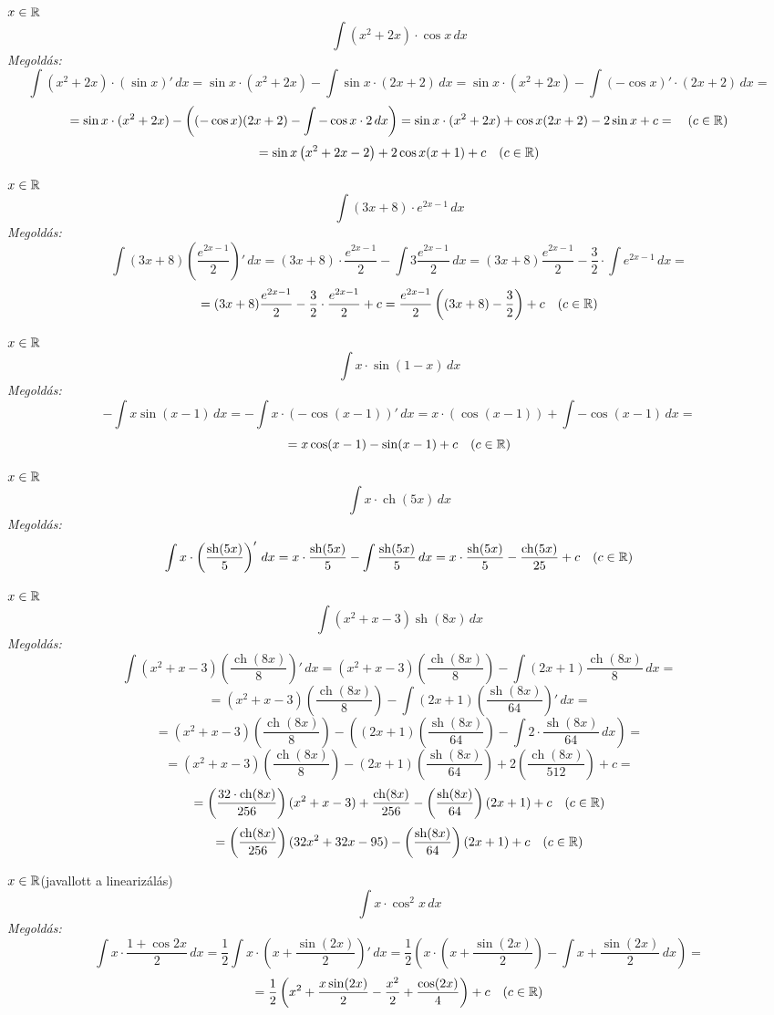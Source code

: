 \documentclass[a4paper,11.5pt]{article}
\DeclareMathOperator{\sh}{sh}
\DeclareMathOperator{\ch}{ch}
\begin{document}
	\begin{exercise}$x\in\mathbb{R}$
		\[ \int(x^2+2x)\cdot\cos x\,dx \]
		\textit{Megoldás:}
		\[ \int(x^2+2x)\cdot(\sin x)'\,dx = \sin x \cdot(x^2+2x)-\int\sin x\cdot(2x + 2)\,dx= \sin x \cdot(x^2+2x)-\int(-\cos x)'\cdot(2x + 2)\,dx= \]
		\[ =\sin x\cdot(x^2+2x)-\left((-\cos x)(2x+2)-\int-\cos x\cdot2\,dx\right)=\sin x\cdot(x^2+2x)+\cos x(2x+2)-2\sin x + c=\quad (c\in\mathbb{R}) \]
		\[ =\sin x\left(x^2+2x -2 \right)+2\cos x(x+1) + c\quad (c\in\mathbb{R}) \]
	\end{exercise}
	\begin{exercise}$x\in\mathbb{R}$
		\[ \int(3x+8)\cdot e^{2x-1}\,dx\]
		\textit{Megoldás:}
		\[\int(3x+8)\left(\frac{e^{2x-1}}{2}\right)'\,dx=(3x+8)\cdot\frac{e^{2x-1}}{2}-\int3\frac{e^{2x-1}}{2}\,dx=(3x+8)\frac{e^{2x-1}}{2}-\frac{3}{2}\cdot\int e^{2x-1}\,dx= \]
		\[ =(3x+8)\frac{e^{2x-1}}{2}-\frac{3}{2}\cdot\frac{e^{2x-1}}{2}+c=\frac{e^{2x-1}}{2}\left((3x+8)-\frac{3}{2}\right)+c\quad (c\in\mathbb{R}) \]
	\end{exercise}
	\begin{exercise}$x\in\mathbb{R}$
		\[ \int x\cdot\sin(1-x)\,dx \]
		\textit{Megoldás:}
		\[ -\int x\sin(x-1)\,dx=-\int x\cdot(-\cos(x-1))'\,dx=x\cdot(\cos(x-1))+\int-\cos(x-1)\,dx=\]
		\[=x\cos(x-1)-\sin(x-1)+c\quad (c\in\mathbb{R}) \]
	\end{exercise}
	\begin{exercise}$x\in\mathbb{R}$
		\[ \int x\cdot\ch(5x)\,dx \]
		\textit{Megoldás:}
		\[ \int x\cdot\left(\frac{\sh(5x)}{5}\right)'\,dx=x\cdot\frac{\sh(5x)}{5}-\int\frac{\sh(5x)}{5}\,dx=x\cdot\frac{\sh(5x)}{5}-\frac{\ch(5x)}{25}+c\quad (c\in\R) \]
	\end{exercise}
	\begin{exercise}$x\in\mathbb{R}$
		\[ \int(x^2+x-3)\sh(8x)\,dx \]
		\textit{Megoldás:}
		\[ \int(x^2+x-3)\left(\frac{\ch(8x)}{8}\right)'\,dx=(x^2+x-3)\left(\frac{\ch(8x)}{8}\right)-\int(2x+1)\frac{\ch(8x)}{8}\,dx=\]
		\[=(x^2+x-3)\left(\frac{\ch(8x)}{8}\right)-\int(2x+1)\left(\frac{\sh(8x)}{64}\right)'\,dx=\]
		\[=(x^2+x-3)\left(\frac{\ch(8x)}{8}\right)-\left((2x+1)\left(\frac{\sh(8x)}{64}\right)-\int2\cdot\frac{\sh(8x)}{64}\,dx\right)=\]
		\[=(x^2+x-3)\left(\frac{\ch(8x)}{8}\right)-(2x+1)\left(\frac{\sh(8x)}{64}\right)+2\left(\frac{\ch(8x)}{512}\right)+c= \]
		\[ =\left(\frac{32\cdot\ch(8x)}{256}\right)(x^2+x-3)+\frac{\ch(8x)}{256}-\left(\frac{\sh(8x)}{64}\right)(2x+1)+c\quad (c\in\R) \]
		\[ =\left(\frac{\ch(8x)}{256}\right)(32x^2+32x-95)-\left(\frac{\sh(8x)}{64}\right)(2x+1)+c\quad (c\in\R) \]
	\end{exercise}
	\begin{exercise} $x\in\mathbb{R}$\quad (javallott a linearizálás)
		\[ \int x\cdot\cos^2x\,dx \]
		\textit{Megoldás:}
		\[ \int x\cdot\frac{1+\cos2x}{2}\,dx=\frac{1}{2}\int x\cdot\left(x+\frac{\sin(2x)}{2}\right)'\,dx=\frac{1}{2}\left(x\cdot\left(x+\frac{\sin(2x)}{2}\right)-\int x+\frac{\sin(2x)}{2}\,dx\right)= \]
		\[ =\frac{1}{2}\left(x^2+\frac{x\sin(2x)}{2}-\frac{x^2}{2}+\frac{\cos(2x)}{4}\right)+c\quad (c\in\mathbb{R}) \]
	\end{exercise}
\end{document}
